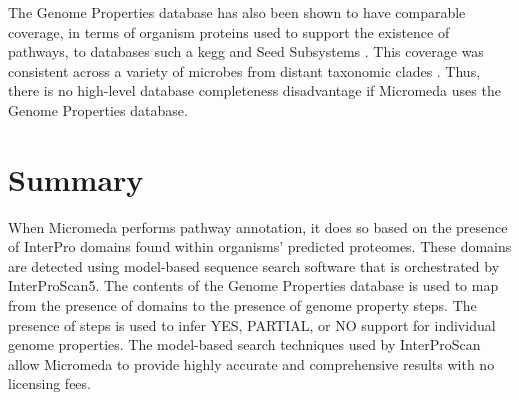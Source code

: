 The Genome Properties database has also been shown to have comparable coverage, 
in terms of organism proteins used to support the existence of pathways, to 
databases such a \gls{kegg} and Seed Subsystems \cite{richardson2018genome}. 
This coverage was consistent across a variety of microbes from distant taxonomic 
clades \cite{richardson2018genome}. Thus, there is no high-level database 
completeness disadvantage if Micromeda uses the Genome Properties database. 

\section{Summary}

When Micromeda performs pathway annotation, it does so based on the presence of 
InterPro domains found within organisms' predicted proteomes. These domains are 
detected using model-based sequence search software that is orchestrated by 
InterProScan5. The contents of the Genome Properties database is used to map 
from the presence of domains to the presence of genome property steps. The 
presence of steps is used to infer YES, PARTIAL, or NO support for individual 
genome properties. The model-based search techniques used by InterProScan allow 
Micromeda to provide highly accurate and comprehensive results with no licensing 
fees.
